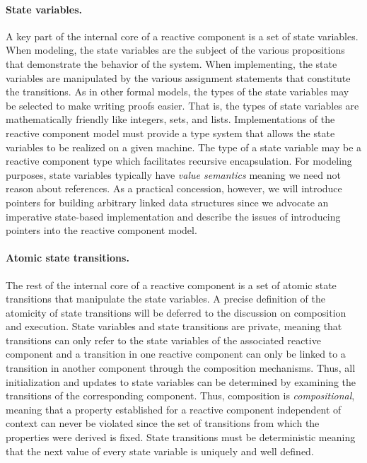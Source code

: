 \paragraph{State variables.}
A key part of the internal core of a reactive component is a set of state variables.
When modeling, the state variables are the subject of the various propositions that demonstrate the behavior of the system.
When implementing, the state variables are manipulated by the various assignment statements that constitute the transitions.
As in other formal models, the types of the state variables may be selected to make writing proofs easier.
That is, the types of state variables are mathematically friendly like integers, sets, and lists.
Implementations of the reactive component model must provide a type system that allows the state variables to be realized on a given machine.
The type of a state variable may be a reactive component type which facilitates recursive encapsulation.
For modeling purposes, state variables typically have \emph{value semantics} meaning we need not reason about references.
As a practical concession, however, we will introduce pointers for building arbitrary linked data structures since we advocate an imperative state-based implementation and describe the issues of introducing pointers into the reactive component model.

\paragraph{Atomic state transitions.}
The rest of the internal core of a reactive component is a set of atomic state transitions that manipulate the state variables.
A precise definition of the atomicity of state transitions will be deferred to the discussion on composition and execution.
State variables and state transitions are private, meaning that transitions can only refer to the state variables of the associated reactive component and a transition in one reactive component can only be linked to a transition in another component through the composition mechanisms.
Thus, all initialization and updates to state variables can be determined by examining the transitions of the corresponding component.
Thus, composition is \emph{compositional}, meaning that a property established for a reactive component independent of context can never be violated since the set of transitions from which the properties were derived is fixed.
State transitions must be deterministic meaning that the next value of every state variable is uniquely and well defined.

